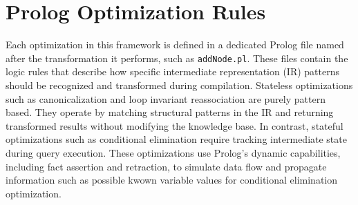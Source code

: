 \section{Prolog Optimization Rules}
Each optimization in this framework is defined in a dedicated Prolog file named after the transformation it performs, such as \texttt{addNode.pl}.
These files contain the logic rules that describe how specific intermediate representation (IR) patterns should be recognized and transformed during compilation.
Stateless optimizations such as canonicalization and loop invariant reassociation are purely pattern based.
They operate by matching structural patterns in the IR and returning transformed results without modifying the knowledge base.
In contrast, stateful optimizations such as conditional elimination require tracking intermediate state during query execution.
These optimizations use Prolog’s dynamic capabilities, including fact assertion and retraction, to simulate data flow and propagate information such as possible kwown variable values for conditional elimination optimization.




